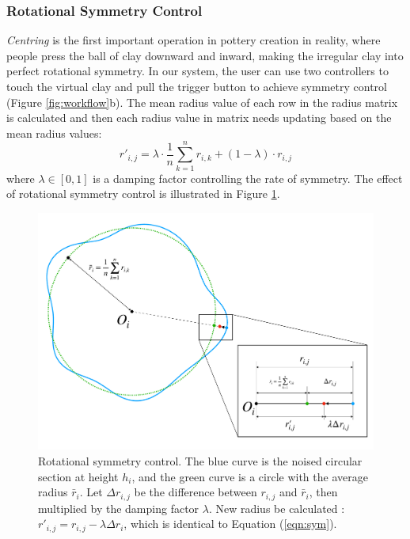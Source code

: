 \documentclass{svjour3}                     %
\begin{document}
\subsubsection{Rotational Symmetry Control}
\label{sec:4.2.1}
\textit{Centring} is the first important operation in pottery creation in reality, where people press the ball of clay downward and inward, making the irregular clay into perfect rotational symmetry.
In our system, the user can use two controllers to touch the virtual clay and pull the trigger button to achieve symmetry control (Figure \ref{fig:workflow}b).
The mean radius value of each row in the radius matrix is calculated and then each radius value in matrix needs updating based on the mean radius values:
\begin{equation}
\label{eqn:sym}
r'_{i,j} = 
\lambda \cdot \frac{1}{n}\sum_{k=1}^{n} r_{i,k}
+ (1 - \lambda) \cdot r_{i,j}
\end{equation}
where $\lambda \in [0,1]$ is a damping factor controlling the rate of symmetry.
The effect of rotational symmetry control is illustrated in Figure \ref{fig:symmetry}.

\begin{figure}
\includegraphics[width=\textwidth]{fig7.pdf}
\caption{Rotational symmetry control. The blue curve is the noised circular section at height $h_{i}$, and the green curve is a circle with the average radius $\bar r_{i}$. Let $\Delta r_{i,j}$ be the difference between $r_{i,j}$ and $\bar r_{i}$, then multiplied by the damping factor $\lambda$. New radius be calculated : $r'_{i, j} = r_{i,j} - \lambda\Delta r_{i}$, which is identical to Equation (\ref{eqn:sym}). }
\label{fig:symmetry}
\end{figure}
\end{document}
